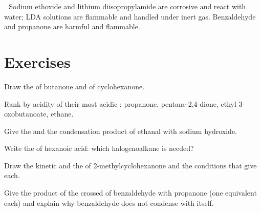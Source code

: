 \begin{safety}{\,\,}
Sodium ethoxide and lithium diisopropylamide are corrosive and react with water; LDA solutions are
flammable and handled under inert gas. Benzaldehyde and propanone are harmful and flammable.
\end{safety}

\section{Exercises}

\begin{exercise}[$\star$]\label{exo:b2:enolates-aldol:1}
Draw the   of butanone and of cyclohexanone.
\end{exercise}

\begin{exercise}[$\star$]\label{exo:b2:enolates-aldol:2}
Rank by acidity of their most acidic : propanone, pentane-2,4-dione, ethyl 3-oxobutanoate,
ethane.
\end{exercise}

\begin{exercise}[$\star$]\label{exo:b2:enolates-aldol:3}
Give the  and the condensation product of ethanal with sodium hydroxide.
\end{exercise}

\begin{exercise}[$\star$]\label{exo:b2:enolates-aldol:4}
Write the  of hexanoic acid: which halogenoalkane is needed?
\end{exercise}

\begin{exercise}[$\star\star$]\label{exo:b2:enolates-aldol:5}
Draw the kinetic and the  of 2-methylcyclohexanone and the conditions that give
each.
\end{exercise}

\begin{exercise}[$\star\star$]\label{exo:b2:enolates-aldol:6}
Give the product of the crossed  of benzaldehyde with propanone (one equivalent
each) and explain why benzaldehyde does not condense with itself.
\end{exercise}


